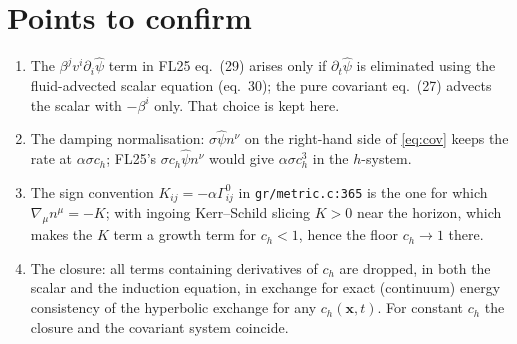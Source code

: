 \documentclass[11pt,a4paper]{article}
\newcommand{\ph}{\hat\psi}
\newcommand{\ch}{c_h}
\newcommand{\pd}{\partial}
\newcommand{\code}[1]{\texttt{#1}}
\begin{document}
\section*{Points to confirm}
\begin{enumerate}
\item The $\beta^jv^i\pd_i\ph$ term in FL25 eq.~(29) arises only if $\pd_t\ph$ is eliminated using the fluid-advected scalar equation (eq.~30); the pure covariant eq.~(27) advects the scalar with $-\beta^i$ only. That choice is kept here.
\item The damping normalisation: $\sigma\ph n^\nu$ on the right-hand side of \eqref{eq:cov} keeps the rate at $\alpha\sigma\ch$; FL25's $\sigma\ch\ph n^\nu$ would give $\alpha\sigma\ch^3$ in the $h$-system.
\item The sign convention $K_{ij}=-\alpha\Gamma^0_{ij}$ in \code{gr/metric.c:365} is the one for which $\nabla_\mu n^\mu=-K$; with ingoing Kerr--Schild slicing $K>0$ near the horizon, which makes the $K$ term a growth term for $\ch<1$, hence the floor $\ch\to1$ there.
\item The closure: all terms containing derivatives of $\ch$ are dropped, in both the scalar and the induction equation, in exchange for exact (continuum) energy consistency of the hyperbolic exchange for any $\ch(\bm x,t)$. For constant $\ch$ the closure and the covariant system coincide.
\end{enumerate}
\end{document}
